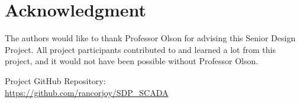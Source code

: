 
\section*{Acknowledgment}

The authors would like to thank Professor Olson for advising this Senior Design Project. All project participants contributed to and learned a lot from this project, and it would not have been possible without Professor Olson.\\

\vspace{1\baselineskip}

Project GitHub Repository: \\
\url{https://github.com/rancorjoy/SDP_SCADA}